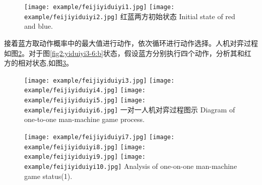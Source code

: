 \begin{figure}[htpb]
	\centering
	\subcaptionbox{\label{fig1:yiduiyi1-2:a}}
	{\texttt{[image: example/feijiyiduiyi1.jpg]}}
	\subcaptionbox{\label{fig1:yiduiyi1-2:b}}
	{\texttt{[image: example/feijiyiduiyi2.jpg]}}
	\bicaption
	{红蓝两方初始状态}
	{Initial state of red and blue.}
	\label{fig1:yiduiyi1-2}
\end{figure}


接着蓝方取动作概率中的最大值进行动作，依次循环进行动作选择。人机对弈过程如图\ref{fig2:yiduiyi3-6}。对于图\ref{fig2:yiduiyi3-6:b}状态，假设蓝方分别执行四个动作，分析其和红方的相对状态,如图\ref{fig2:yiduiyi7-10}。

\begin{figure}[htp]
	\centering
	\subcaptionbox{\label{fig2:yiduiyi3-6:a}}
	{\texttt{[image: example/feijiyiduiyi3.jpg]}}
	\subcaptionbox{\label{fig2:yiduiyi3-6:b}}
	{\texttt{[image: example/feijiyiduiyi4.jpg]}}
	\newline
	\centering
	\subcaptionbox{\label{fig2:yiduiyi3-6:c}}
	{\texttt{[image: example/feijiyiduiyi5.jpg]}}
	\subcaptionbox{\label{fig2:yiduiyi3-6:d}}
	{\texttt{[image: example/feijiyiduiyi6.jpg]}}
	\bicaption
	{一对一人机对弈过程图示}
	{Diagram of one-to-one man-machine game process.}
	\label{fig2:yiduiyi3-6}
\end{figure}


\begin{figure}[htbp]
	\centering
	{\texttt{[image: example/feijiyiduiyi7.jpg]}}
	\hspace{0.5em}
	{\texttt{[image: example/feijiyiduiyi8.jpg]}}
	\newline
	\centering
	{\texttt{[image: example/feijiyiduiyi9.jpg]}}
	\hspace{0.5em}
	{\texttt{[image: example/feijiyiduiyi10.jpg]}}
	{Analysis of one-on-one man-machine game status(1).}
	\label{fig2:yiduiyi7-10}
\end{figure}

